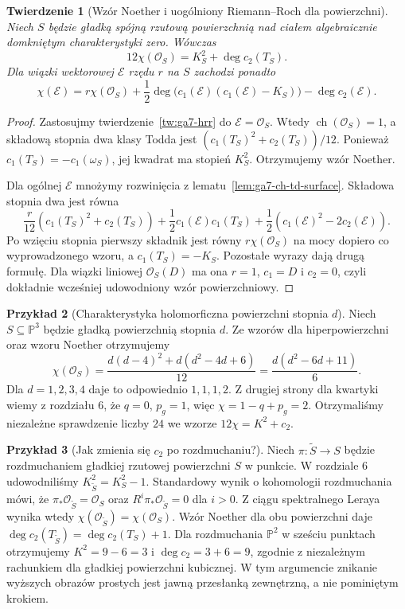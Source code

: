 \documentclass[11pt,a4paper,openany]{report}
\numberwithin{equation}{section}
\theoremstyle{plain}
\newtheorem{twierdzenie}{Twierdzenie}[section]
\theoremstyle{definition}
\newtheorem{przyklad}[twierdzenie]{Przykład}
\theoremstyle{remark}
\newcommand{\PP}{\mathbb P}
\begin{document}
\begin{twierdzenie}[Wzór Noether i uogólniony Riemann--Roch dla powierzchni]
\label{tw:ga7-noether}
Niech $S$ będzie gładką spójną rzutową powierzchnią
nad ciałem algebraicznie domkniętym charakterystyki zero.
Wówczas
\[
12\chi(\mathcal O_S)=K_S^2+\deg c_2(T_S).
\]
Dla wiązki wektorowej $\mathcal E$ rzędu $r$ na $S$
zachodzi ponadto
\[
\chi(\mathcal E)=r\chi(\mathcal O_S)
+\frac12\deg\bigl(c_1(\mathcal E)
(c_1(\mathcal E)-K_S)\bigr)
-\deg c_2(\mathcal E).
\]
\end{twierdzenie}
\begin{proof}
Zastosujmy twierdzenie~\ref{tw:ga7-hrr} do
$\mathcal E=\mathcal O_S$. Wtedy
$\operatorname{ch}(\mathcal O_S)=1$,
a składową stopnia dwa klasy Todda jest
$(c_1(T_S)^2+c_2(T_S))/12$.
Ponieważ $c_1(T_S)=-c_1(\omega_S)$, jej kwadrat
ma stopień $K_S^2$. Otrzymujemy wzór Noether.

Dla ogólnej $\mathcal E$ mnożymy rozwinięcia
z lematu~\ref{lem:ga7-ch-td-surface}. Składowa
stopnia dwa jest równa
\[
\frac r{12}(c_1(T_S)^2+c_2(T_S))
+\frac12c_1(\mathcal E)c_1(T_S)
+\frac12(c_1(\mathcal E)^2-2c_2(\mathcal E)).
\]
Po wzięciu stopnia pierwszy składnik jest równy
$r\chi(\mathcal O_S)$ na mocy dopiero co
wyprowadzonego wzoru, a $c_1(T_S)=-K_S$.
Pozostałe wyrazy dają drugą formułę.
Dla wiązki liniowej $\mathcal O_S(D)$ ma ona
$r=1$, $c_1=D$ i $c_2=0$, czyli dokładnie
wcześniej udowodniony wzór powierzchniowy.
\end{proof}

\begin{przyklad}[Charakterystyka holomorficzna powierzchni stopnia $d$]
Niech $S\subseteq\PP^3$ będzie gładką powierzchnią
stopnia $d$. Ze wzorów dla hiperpowierzchni oraz
wzoru Noether otrzymujemy
\[
\chi(\mathcal O_S)=\frac{d(d-4)^2+d(d^2-4d+6)}{12}
=\frac{d(d^2-6d+11)}6.
\]
Dla $d=1,2,3,4$ daje to odpowiednio $1,1,1,2$.
Z drugiej strony dla kwartyki wiemy z rozdziału 6,
że $q=0$, $p_g=1$, więc $\chi=1-q+p_g=2$.
Otrzymaliśmy niezależne sprawdzenie liczby $24$
we wzorze $12\chi=K^2+c_2$.
\end{przyklad}

\begin{przyklad}[Jak zmienia się $c_2$ po rozdmuchaniu?]
\label{prz:ga7-blowup-c2}
Niech $\pi:\widetilde S\to S$ będzie rozdmuchaniem
gładkiej rzutowej powierzchni $S$ w punkcie.
W rozdziale 6 udowodniliśmy
$K_{\widetilde S}^2=K_S^2-1$.
Standardowy wynik o kohomologii rozdmuchania mówi, że
$\pi_*\mathcal O_{\widetilde S}=\mathcal O_S$ oraz
$R^i\pi_*\mathcal O_{\widetilde S}=0$ dla $i>0$.
Z ciągu spektralnego Leraya wynika wtedy
$\chi(\mathcal O_{\widetilde S})=\chi(\mathcal O_S)$.
Wzór Noether dla obu powierzchni daje
$\deg c_2(T_{\widetilde S})=\deg c_2(T_S)+1$.
Dla rozdmuchania $\PP^2$ w sześciu punktach otrzymujemy
$K^2=9-6=3$ i $\deg c_2=3+6=9$, zgodnie
z niezależnym rachunkiem dla gładkiej powierzchni kubicznej.
W tym argumencie znikanie wyższych obrazów prostych
jest jawną przesłanką zewnętrzną, a nie pominiętym krokiem.
\end{przyklad}
\end{document}
